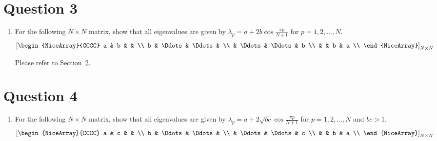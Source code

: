 \section{Question 3}
\begin{enumerate}[label=(\alph*)]
    \item For the following $N\times N$ matrix, show that all eigenvalues are given by $\lambda_p = a+2b\cos\tfrac{\pi p}{N+1}$ for $p=1,2,\ldots,N$.
        \[
            \qty[\begin{NiceArray}{CCCC}
                a & b      &        &   \\
                b & \Ddots & \Ddots &   \\
                  & \Ddots & \Ddots & b \\
                  &        & b      & a \\
            \end{NiceArray}]_{N\times N}
        \]
        \begin{solution}{}{}
            Please refer to Section~\ref{Q:4-1}.
        \end{solution}
\end{enumerate}



\section{Question 4}\label{Q:4-1}
\begin{enumerate}[label=(\alph*)]
    \item For the following $N\times N$ matrix, show that all eigenvalues are given by $\lambda_p = a+2\sqrt{bc}\cos\tfrac{\pi p}{N+1}$ for $p=1,2,\ldots,N$ and $bc>1$.
        \[
            \qty[\begin{NiceArray}{CCCC}
                a & c      &        &   \\
                b & \Ddots & \Ddots &   \\
                  & \Ddots & \Ddots & c \\
                  &        & b      & a \\
            \end{NiceArray}]_{N\times N}
        \]
\end{enumerate}



